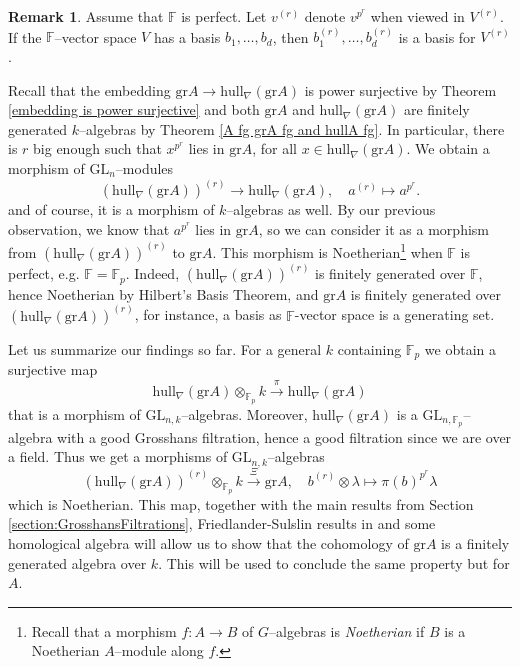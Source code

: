 \documentclass{article}
\theoremstyle{plain}
\theoremstyle{definition}
\newtheorem{Rem}[Th]{Remark}
\newcommand{\GL}{\mathrm{GL}}
\begin{document}
\begin{Rem}
  Assume that $\mathbb{F}$ is perfect.  Let $v^{(r)}$ denote $v^{p^r}$ when  viewed in $V^{(r)}$. If the $\mathbb{F}$--vector space $V$ has a basis $b_1,\ldots,b_d$, then $b_1^{(r)},\ldots,b_d^{(r)}$ is a basis for $V^{(r)}$.  
\end{Rem}


Recall that the embedding $\mathrm{gr}A\to \mathrm{hull}_\nabla(\mathrm{gr}A)$ is power surjective by Theorem \ref{embedding is power surjective} and both $\mathrm{gr}A$ and $\mathrm{hull}_\nabla(\mathrm{gr}A)$ are finitely generated $k$--algebras by Theorem \ref{A fg grA fg and hullA fg}. In particular, there is  $r$ big enough such that $ x^{p^r}$ lies in $\mathrm{gr}A$, for all $x\in \mathrm{hull}_\nabla(\mathrm{gr}A)$. We obtain a  morphism of $\GL_n$--modules
\[
 (\mathrm{hull}_\nabla(\mathrm{gr}A))^{(r)} \to \mathrm{hull}_\nabla(\mathrm{gr}A), \quad
    a^{(r)}  \mapsto a^{p^r}. 
\]
\noindent and of course, it is a morphism of $k$--algebras as well. By our previous observation, we know that $a^{p^r}$ lies in $\mathrm{gr}A$, so we can consider it as a morphism from $(\mathrm{hull}_\nabla(\mathrm{gr}A))^{(r)}$ to $\mathrm{gr}A$.   This morphism is Noetherian\footnote{Recall that a morphism $f\colon A\to B$ of $G$--algebras is \textit{Noetherian} if  $B$ is a Noetherian $A$--module along $f$.} when $\mathbb{F}$ is perfect, e.g. $\mathbb{F}=\mathbb{F}_p$. Indeed, $(\mathrm{hull}_\nabla(\mathrm{gr}A))^{(r)}$ is finitely generated over $\mathbb{F}$, hence Noetherian by Hilbert's Basis Theorem, and $\mathrm{gr}A$ is finitely generated over $(\mathrm{hull}_\nabla(\mathrm{gr}A))^{(r)}$, for instance, a basis as $\mathbb{F}$-vector space is a generating set.  

Let us summarize our findings so far.  For a general $k$ containing $\mathbb{F}_p$ we obtain a surjective map
\begin{equation*}
\mathrm{hull}_\nabla(\mathrm{gr}A)\otimes_{\mathbb{F}_p}k\xrightarrow[]{\pi} \mathrm{hull}_\nabla(\mathrm{gr}A)    
\end{equation*}
 that is a morphism of ${\GL}_{n,k}$--algebras. Moreover, $\mathrm{hull}_\nabla(\mathrm{gr}A)$ is a $\GL_{n,{\mathbb{F}_p}}$--algebra with a good Grosshans filtration, hence a good filtration since we are over a field.  Thus we get a morphisms of $\GL_{n,k}$--algebras 
\begin{equation}\label{definition of the map Xi}
    (\mathrm{hull}_\nabla(\mathrm{gr}A))^{(r)}\otimes_{\mathbb{F}_p}k \xrightarrow[]{\Xi} \mathrm{gr}A, \quad
    b^{(r)}\otimes \lambda \mapsto \pi(b)^{p^r}\lambda
\end{equation}
\noindent which is Noetherian. This map, together with the main results from Section \ref{section:GrosshansFiltrations}, Friedlander-Sulslin results in \cite{FS97} and some homological algebra will allow us to show that the cohomology of $\mathrm{gr}A$ is a finitely generated algebra over $k$. This will be used to conclude the same property but for $A$. 
\end{document}
